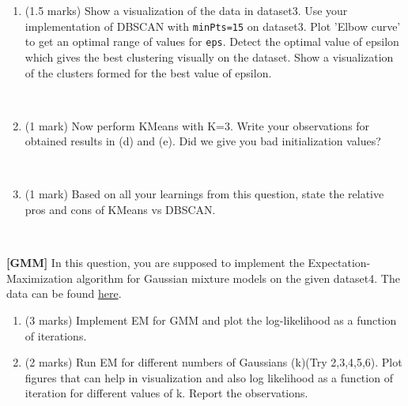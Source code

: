 \documentclass[addpoints,12pt,solution]{exam}
\begin{document}
\begin{questions}
\begin{enumerate}[label=(\alph*)]
\begin{solution}
\end{solution}

\item (1.5 marks) Show a visualization of the data in dataset3. Use your implementation of DBSCAN with \texttt{minPts=15} on dataset3. Plot 'Elbow curve' to get an optimal range of values for \texttt{eps}. Detect the optimal value of epsilon which gives the best clustering visually on the dataset. Show a visualization of the clusters formed for the best value of epsilon.

\begin{solution} \\

\end{solution}

\item (1 mark) Now perform KMeans with K=3. Write your observations for obtained results in (d) and (e). Did we give you bad initialization values?

\begin{solution} \\

\end{solution}


\item (1 mark) Based on all your learnings from this question, state the relative pros and cons of KMeans vs DBSCAN.

\begin{solution} \\

\end{solution}
\end{enumerate}
\question \textbf{[GMM]} 
In this question, you are supposed to implement the Expectation-Maximization algorithm for Gaussian mixture models on the given dataset4. The data can be found \href{https://drive.google.com/drive/folders/1uVdd8J0BhtuJ6r_93N70zASaRmcoyKiz}{here}. 

\begin{enumerate}[label=(\alph*)]

\item (3 marks) Implement EM for GMM and plot the log-likelihood as a function of iterations.

\begin{solution}


\end{solution}

\item (2 marks) Run EM for different numbers of Gaussians (k)(Try 2,3,4,5,6). Plot figures that can help in visualization and also log likelihood as a function of iteration for different values of k. Report the observations.


\end{enumerate}
\end{questions}
\end{document}
